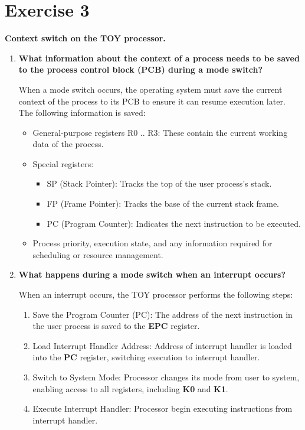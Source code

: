\documentclass{article}
\newcommand{\exercise}[1]{
    \section*{Exercise #1}
    \markboth{Exercise #1}{}
}
\begin{document}
\newpage
\exercise{3}

\textbf{Context switch on the TOY processor.}

\begin{enumerate}[label=\textbf{\alph*})]
    \item \textbf{What information about the context of a process needs to be saved to the process control block (PCB) during a mode switch?}
    
    When a mode switch occurs, the operating system must save the current context of the process to its PCB to ensure it can resume execution later. The following information is saved:
    \begin{itemize}
        \item General-purpose registers R0 .. R3: These contain the current working
        data of the process.
        \item Special registers:
        \begin{itemize}
            \item SP (Stack Pointer): Tracks the top of the user process's stack.
            \item FP (Frame Pointer): Tracks the base of the current stack frame.
            \item PC (Program Counter): Indicates the next instruction to be executed.
        \end{itemize}
        \item Process priority, execution state, and any information required
        for scheduling or resource management.
    \end{itemize}


    \item \textbf{What happens during a mode switch when an interrupt occurs?}

    When an interrupt occurs, the TOY processor performs the following steps:
    \begin{enumerate}
        \item Save the Program Counter (PC): The address of the next instruction
        in the user process is saved to the \textbf{EPC} register.
        \item Load Interrupt Handler Address: Address of interrupt
        handler is loaded into the \textbf{PC} register, switching execution
        to interrupt handler.
        \item Switch to System Mode: Processor changes its mode from user to system,
        enabling access to all registers, including \textbf{K0} and \textbf{K1}.
        \item Execute Interrupt Handler: Processor begin executing
        instructions from interrupt handler.
    \end{enumerate}

\end{enumerate}

\newpage


\end{document}
